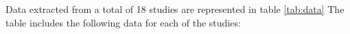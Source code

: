 Data extracted from a total of 18 studies are represented in table \ref{tab:data}
The table includes the following data for each of the studies:
\lipsum
\newpage
\onecolumn
